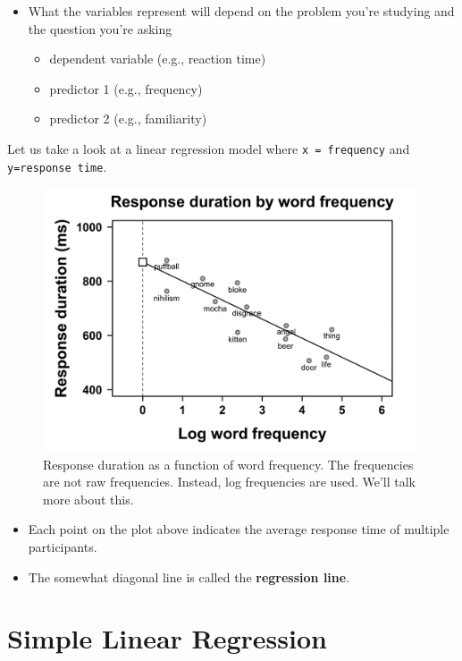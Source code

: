 \documentclass[
]{book}
\providecommand{\tightlist}{%
  \setlength{\itemsep}{0pt}\setlength{\parskip}{0pt}}
\begin{document}
\begin{itemize}
\tightlist
\item
  What the variables represent will depend on the problem you're studying and the question you're asking

  \begin{itemize}
  \tightlist
  \item
    dependent variable (e.g., reaction time)
  \item
    predictor 1 (e.g., frequency)
  \item
    predictor 2 (e.g., familiarity)
  \end{itemize}
\end{itemize}

Let us take a look at a linear regression model where \texttt{x\ =\ frequency} and \texttt{y=response\ time}.

\begin{figure}
\centering
\includegraphics{./img/lr/lr1.png}
\caption{\label{fig:linearregression1}Response duration as a function of word frequency. The frequencies are not raw frequencies. Instead, log frequencies are used. We'll talk more about this.}
\end{figure}

\begin{itemize}
\tightlist
\item
  Each point on the plot above indicates the average response time of multiple participants.
\item
  The somewhat diagonal line is called the \textbf{regression line}.
\end{itemize}

\section{Simple Linear Regression}\label{simple-linear-regression}
\end{document}
